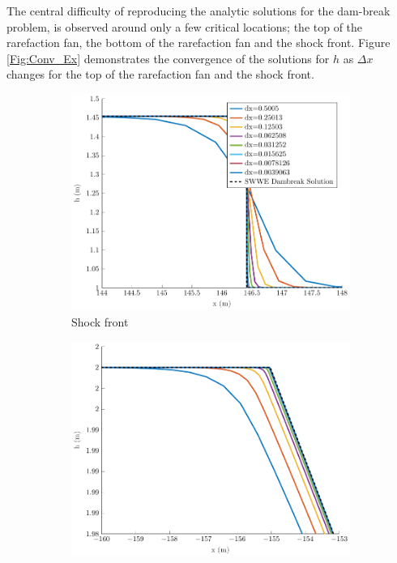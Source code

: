 \documentclass[10pt]{elsarticle}
\begin{document}
The central difficulty of reproducing the analytic solutions for the dam-break problem, is observed around only a few critical locations; the top of the rarefaction fan, the bottom of the rarefaction fan and the shock front. Figure \ref{Fig:Conv_Ex} demonstrates the convergence of the solutions for $h$ as $\Delta x$ changes for the top of the rarefaction fan and the shock front. 
%
\begin{figure}
	\centering
	\begin{subfigure}{0.45\textwidth}
		\centering
		\includegraphics[width=\textwidth]{./Figures/Simulations/Validation/DBSWWE/hFront.pdf}
		\caption{Shock front}
	\end{subfigure}
	\begin{subfigure}{0.45\textwidth}
		\centering
		\includegraphics[width=\textwidth]{./Figures/Simulations/Validation/DBSWWE/hRFTop.pdf}

\end{subfigure}
\end{figure}
\end{document}
